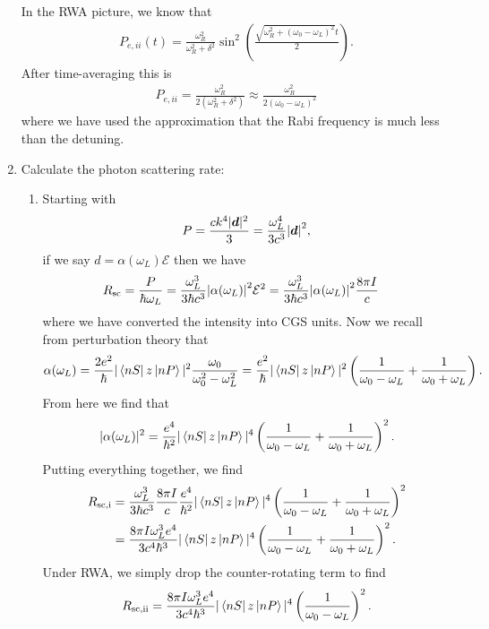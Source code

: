\documentclass{article}
\theoremstyle{definition}
\newcommand{\al}{\alpha}
\newcommand{\f}[2]{\frac{#1}{#2}}
\newcommand{\lp}{\left(}
\newcommand{\rp}{\right)}
\begin{document}
\begin{enumerate}[label=(\alph*)]
	In the RWA picture, we know that
	\begin{align*}
	P_{e,ii}(t) = \f{\omega_R^2}{\omega^2_R + \delta^2} \sin^2 \lp \f{\sqrt{\omega_R^2 + (\omega_0 - \omega_L)^2} t}{2} \rp.
	\end{align*}
	After time-averaging this is 
	\begin{align*}
	P_{e,ii} = \f{\omega_R^2}{2(\omega^2_R + \delta^2)} \approx  \boxed{\f{\omega_R^2}{2 (\omega_0 - \omega_L)^2}}
	\end{align*}
	where we have used the approximation that the Rabi frequency is much less than the detuning.
	
	\item Calculate the photon scattering rate:
	
	\begin{enumerate}[label=(\roman*)]
		\item Starting with
		\begin{align*}
			P = \f{ck^4|\bm{d}|^2}{3} = \f{\omega_L^4}{3c^3}\abs{\bm{d}}^2,
		\end{align*}
		if we say $d = \al(\omega_L)\mathcal{E}$ then we have
		\begin{align*}
			R_\text{sc} &= \f{P}{\hbar \omega_L}= \f{\omega_L^3}{3\hbar c^3}\abs{\al(\omega_L)}^2 \mathcal{E}^2= \f{\omega_L^3}{3\hbar c^3}\abs{\al(\omega_L)}^2 \f{8\pi I}{c}
		\end{align*}
		where we have converted the intensity into CGS units. Now we recall from perturbation theory that
		\begin{align*}
			\al(\omega_L) = \f{2e^2}{\hbar} |\bra{nS} z \ket{nP}|^2 \f{\omega_0}{\omega_0^2 - \omega_L^2} = \f{e^2}{\hbar} |\bra{nS} z \ket{nP}|^2 \lp \f{1}{\omega_0 - \omega_L} + \f{1}{\omega_0 + \omega_L} \rp.
		\end{align*}
		From here we find that
		\begin{align*}
			|\al(\omega_L)|^2 = \f{e^4}{\hbar^2} |\bra{nS} z \ket{nP}|^4 \lp \f{1}{\omega_0 - \omega_L} + \f{1}{\omega_0 + \omega_L} \rp^2.
		\end{align*}
		Putting everything together, we find 
		\begin{align*}
			R_\text{sc,i} &= \f{\omega_L^3}{3\hbar c^3}\f{8\pi I}{c}\f{e^4}{\hbar^2} |\bra{nS} z \ket{nP}|^4 \lp \f{1}{\omega_0 - \omega_L} + \f{1}{\omega_0 + \omega_L} \rp^2\\
			&= \f{8\pi I\omega_L^3 e^4}{3 c^4 \hbar^3} |\bra{nS} z \ket{nP}|^4 \lp \f{1}{\omega_0 - \omega_L} + \f{1}{\omega_0 + \omega_L} \rp^2.
		\end{align*}
		Under RWA, we simply drop the counter-rotating term to find 
		\begin{align*}
			R_\text{sc,ii}= \f{8\pi I\omega_L^3 e^4}{3 c^4 \hbar^3} |\bra{nS} z \ket{nP}|^4 \lp \f{1}{\omega_0 - \omega_L} \rp^2.
		\end{align*}
		

\end{enumerate}
\end{enumerate}
\end{document}
